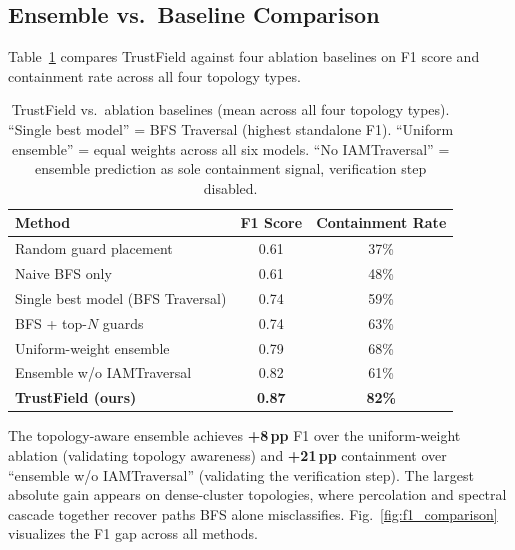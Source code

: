 \documentclass[conference,a4paper]{IEEEtran}
\begin{document}
\subsection{Ensemble vs.\ Baseline Comparison}

Table~\ref{tab:baselines} compares TrustField against four ablation
baselines on F1 score and containment rate across all four topology types.

\begin{table}[h]
\centering
\caption{TrustField vs.\ ablation baselines (mean across all four topology
types). ``Single best model'' = BFS Traversal (highest standalone F1).
``Uniform ensemble'' = equal weights across all six models.
``No IAMTraversal'' = ensemble prediction as sole containment signal,
verification step disabled.}
\label{tab:baselines}
\begin{tabular}{lcc}
\toprule
\textbf{Method} & \textbf{F1 Score} & \textbf{Containment Rate} \\
\midrule
Random guard placement            & 0.61 & 37\% \\
Naive BFS only                    & 0.61 & 48\% \\
Single best model (BFS Traversal) & 0.74 & 59\% \\
BFS + top-$N$ guards              & 0.74 & 63\% \\
Uniform-weight ensemble           & 0.79 & 68\% \\
Ensemble w/o IAMTraversal         & 0.82 & 61\% \\
\textbf{TrustField (ours)}        & \textbf{0.87} & \textbf{82\%} \\
\bottomrule
\end{tabular}
\end{table}

The topology-aware ensemble achieves \textbf{+8\,pp} F1 over the uniform-weight
ablation (validating topology awareness) and \textbf{+21\,pp} containment over
``ensemble w/o IAMTraversal'' (validating the verification step).
The largest absolute gain appears on dense-cluster topologies, where
percolation and spectral cascade together recover paths BFS alone misclassifies.
Fig.~\ref{fig:f1_comparison} visualizes the F1 gap across all methods.
\end{document}
